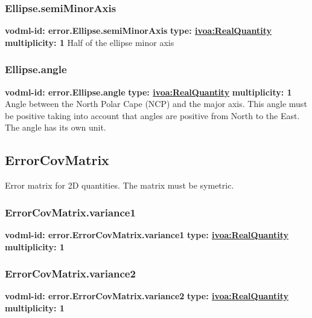     \subsubsection{Ellipse.semiMinorAxis}
      \textbf{vodml-id: error.Ellipse.semiMinorAxis} \newline
      \textbf{type: \hyperref[sect:ivoa]{ivoa:RealQuantity}} \newline
      \textbf{multiplicity: 1} \newline 
      Half of the ellipse minor axis

    \subsubsection{Ellipse.angle}
      \textbf{vodml-id: error.Ellipse.angle} \newline
      \textbf{type: \hyperref[sect:ivoa]{ivoa:RealQuantity}} \newline
      \textbf{multiplicity: 1} \newline 
      Angle between the North Polar Cape (NCP) and the major axis. This angle must be positive taking into account that angles are positive from North to the East. The angle has its own unit.

  \subsection{ErrorCovMatrix}
  \label{sect:error.ErrorCovMatrix}
    Error matrix for 2D quantities. The matrix must be symetric.

    \subsubsection{ErrorCovMatrix.variance1}
      \textbf{vodml-id: error.ErrorCovMatrix.variance1} \newline
      \textbf{type: \hyperref[sect:ivoa]{ivoa:RealQuantity}} \newline
      \textbf{multiplicity: 1} \newline 
      

    \subsubsection{ErrorCovMatrix.variance2}
      \textbf{vodml-id: error.ErrorCovMatrix.variance2} \newline
      \textbf{type: \hyperref[sect:ivoa]{ivoa:RealQuantity}} \newline
      \textbf{multiplicity: 1} \newline 
      

